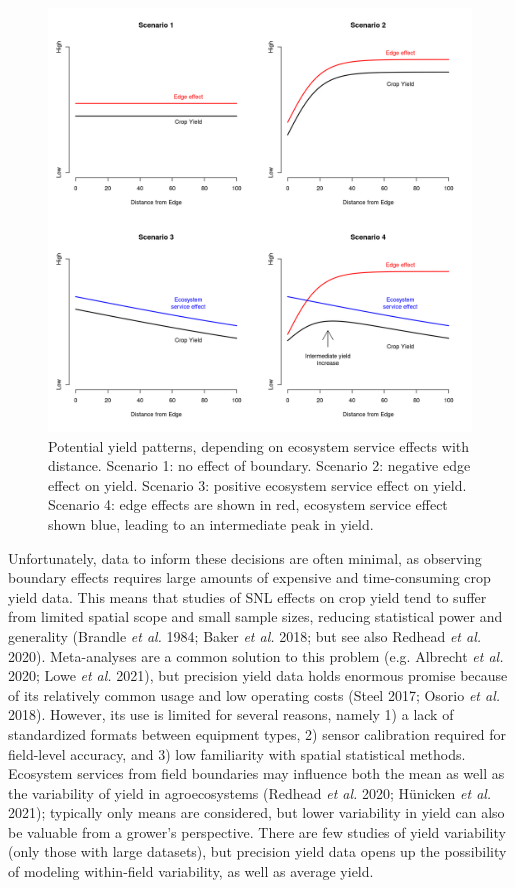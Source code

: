 \documentclass[]{elsarticle} %
\begin{document}
\begin{figure}
\includegraphics[width=1\linewidth]{../Figures/ExamplePlots/hypotheses} \caption{Potential yield patterns, depending on ecosystem service effects with distance. Scenario 1: no effect of boundary. Scenario 2: negative edge effect on yield. Scenario 3: positive ecosystem service effect on yield. Scenario 4: edge effects are shown in red, ecosystem service effect shown blue, leading to an intermediate peak in yield.}\label{fig:hypotheses}
\end{figure}

Unfortunately, data to inform these decisions are often minimal, as observing boundary effects requires large amounts of expensive and time-consuming crop yield data.
This means that studies of SNL effects on crop yield tend to suffer from limited spatial scope and small sample sizes, reducing statistical power and generality (Brandle \emph{et al.} 1984; Baker \emph{et al.} 2018; but see also Redhead \emph{et al.} 2020).
Meta-analyses are a common solution to this problem (e.g. Albrecht \emph{et al.} 2020; Lowe \emph{et al.} 2021), but precision yield data holds enormous promise because of its relatively common usage and low operating costs (Steel 2017; Osorio \emph{et al.} 2018).
However, its use is limited for several reasons, namely 1) a lack of standardized formats between equipment types, 2) sensor calibration required for field-level accuracy, and 3) low familiarity with spatial statistical methods.
Ecosystem services from field boundaries may influence both the mean as well as the variability of yield in agroecosystems (Redhead \emph{et al.} 2020; Hünicken \emph{et al.} 2021); typically only means are considered, but lower variability in yield can also be valuable from a grower's perspective.
There are few studies of yield variability (only those with large datasets), but precision yield data opens up the possibility of modeling within-field variability, as well as average yield.
\end{document}

